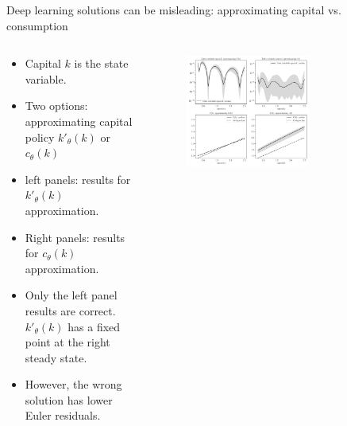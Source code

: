 \documentclass[aspectratio=169,10pt]{beamer}
\begin{document}
\begin{frame}{Deep learning solutions can be misleading: approximating capital vs. consumption}
	\begin{columns}
		\begin{column}{0.5\textwidth}
			\begin{itemize}
			\item Capital $k$ is the state variable.
			\smallskip
			\item Two options: approximating capital policy $k'_\theta(k)$ or $c_\theta(k)$
			\item left panels: results for $k'_\theta(k)$ approximation.
			\smallskip
			\item Right panels: results for $c_\theta(k)$ approximation.
			\smallskip
			\item Only the left panel results are correct. 
			$k'_\theta(k)$ has a fixed point at the right steady state.
			\smallskip
			\item However, the wrong solution has lower Euler residuals.
			\end{itemize}
		\end{column}
		\begin{column}{0.75\textwidth}
			\begin{figure}[t!]
				\centering
				\includegraphics[width=0.65\textwidth]{figs/growth_recursive_g0_euler_residuals_grid.pdf}
				\hspace{32mm}
			\end{figure}
		\end{column}
	\end{columns}
	\end{frame}
	
\end{document}
